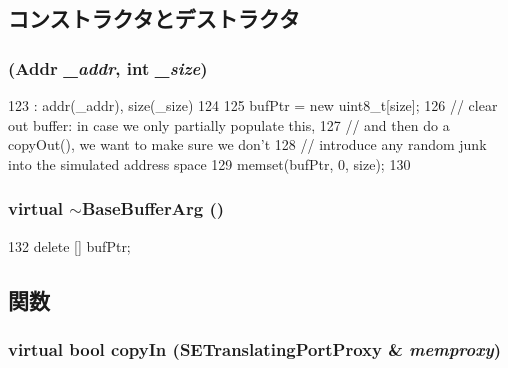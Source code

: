 \subsection{コンストラクタとデストラクタ}
\hypertarget{classBaseBufferArg_a4c9d2832c9c1eb28f96dcc3cf2e3e5bc}{
\subsubsection[{BaseBufferArg}]{ ({\bf Addr} {\em \_\-addr}, \/  int {\em \_\-size})}}
\label{classBaseBufferArg_a4c9d2832c9c1eb28f96dcc3cf2e3e5bc}



\begin{DoxyCode}
123                                          : addr(_addr), size(_size)
124     {
125         bufPtr = new uint8_t[size];
126         // clear out buffer: in case we only partially populate this,
127         // and then do a copyOut(), we want to make sure we don't
128         // introduce any random junk into the simulated address space
129         memset(bufPtr, 0, size);
130     }
\end{DoxyCode}
\hypertarget{classBaseBufferArg_a217d9ef0236c3a53d5b8abc75b40f2b5}{
\subsubsection[{$\sim$BaseBufferArg}]{\setlength{\rightskip}{0pt plus 5cm}virtual $\sim${\bf BaseBufferArg} ()}}
\label{classBaseBufferArg_a217d9ef0236c3a53d5b8abc75b40f2b5}



\begin{DoxyCode}
132 { delete [] bufPtr; }
\end{DoxyCode}


\subsection{関数}
\hypertarget{classBaseBufferArg_a857fbf24e9b55ad1f3d566d9c7768b93}{
\subsubsection[{copyIn}]{\setlength{\rightskip}{0pt plus 5cm}virtual bool copyIn ({\bf SETranslatingPortProxy} \& {\em memproxy})}}
\label{classBaseBufferArg_a857fbf24e9b55ad1f3d566d9c7768b93}



